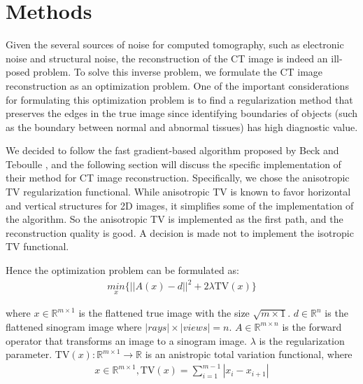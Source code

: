 \documentclass[12pt]{article}
\newcommand{\noin}{\noindent}
\begin{document}
\section{Methods}

\noin Given the several sources of noise for computed tomography\cite{Duan2013-mi}, such as electronic noise and structural noise, the reconstruction of the CT image is indeed an ill-posed problem. To solve this inverse problem, we formulate the CT image reconstruction as an optimization problem. One of the important considerations for formulating this optimization problem is to find a regularization method that preserves the edges in the true image since identifying boundaries of objects (such as the boundary between normal and abnormal tissues) has high diagnostic value.

\vspace{0.2in}

\noin We decided to follow the fast gradient-based algorithm proposed by Beck and Teboulle \cite{Beck2009-id}, and the following section will discuss the specific implementation of their method for CT image reconstruction. Specifically, we chose the anisotropic TV regularization functional. While anisotropic TV is known to favor horizontal and vertical structures for 2D images\cite{Condat2017-uj}, it simplifies some of the implementation of the algorithm. So the anisotropic TV is implemented as the first path, and the reconstruction quality is good. A decision is made not to implement the isotropic TV functional. 

\vspace{0.2in}

\noin Hence the optimization problem can be formulated as:
\begin{align}
 \underset{x}{min}\{ ||A(x) - d||^2 + 2 \lambda\text{TV}(x)\} \label{eq1}
\end{align}

\noin where
$x \in \mathbb{R}^{m \times 1}$ is the flattened true image with the size $\sqrt{m \times 1}$.
$d \in \mathbb{R}^n$ is the flattened sinogram image where $ |rays|\times|views| = n$.
$A \in \mathbb{R}^{m \times n}$ is the forward operator that transforms an image to a sinogram image.
$\lambda$ is the regularization parameter. 
$\text{TV}(x): \mathbb{R}^{m\times 1} \rightarrow \mathbb{R}$  is an anistropic total variation functional, where 
\begin{align}
    x \in \mathbb{R}^{m\times 1}, \text{TV}(x) = \sum_{i=1}^{m-1}{|x_i - x_{i+1}|} 
\end{align}
\end{document}
